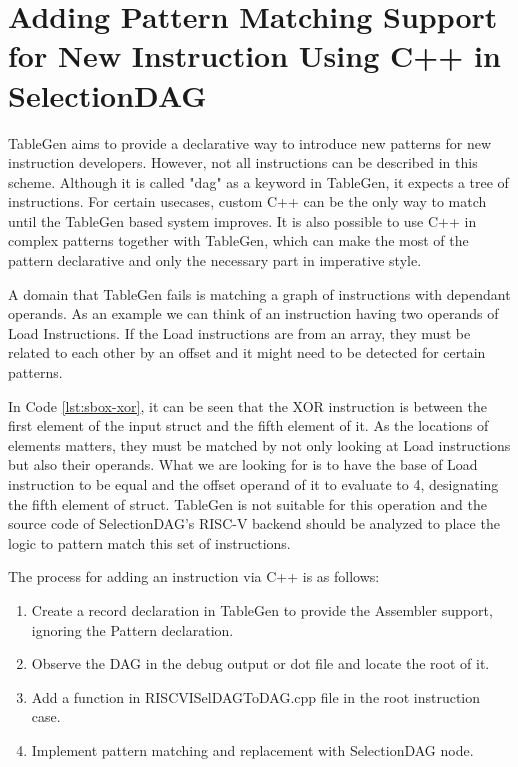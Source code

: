 \section{Adding Pattern Matching Support for New Instruction Using C++ in SelectionDAG}
TableGen aims to provide a declarative way to introduce new patterns for new instruction developers. However, not all instructions can be described in this scheme.  Although it is called "dag" as a keyword in TableGen, it expects a tree of instructions. For certain usecases, custom C++ can be the only way to match until the TableGen based system improves. It is also possible to use C++ in complex patterns together with TableGen, which can make the most of the pattern declarative and only the necessary part in imperative style.
\par
A domain that TableGen fails is matching a graph of instructions with dependant operands. As an example we can think of an instruction having two operands of Load Instructions. If the Load instructions are from an array, they must be related to each other by an offset and it might need to be detected for certain patterns.




In Code \ref{lst:sbox-xor}, it can be seen that the XOR instruction is between the first element of the input struct and the fifth element of it. As the locations of elements matters, they must be matched by not only looking at Load instructions but also their operands. What we are looking for is to have the base of Load instruction to be equal and the offset operand of it to evaluate to 4, designating the fifth element of struct. TableGen is not suitable for this operation and the source code of SelectionDAG's RISC-V backend should be analyzed to place the logic to pattern match this set of instructions.

The process for adding an instruction via C++ is as follows:
\begin{enumerate}
    \item Create a record declaration in TableGen to provide the Assembler support, ignoring the Pattern declaration.
    \item Observe the DAG in the debug output or dot file and locate the root of it. 
    \item Add a function in RISCVISelDAGToDAG.cpp file in the root instruction case. 
    \item Implement pattern matching and replacement with SelectionDAG node.
\end{enumerate}

